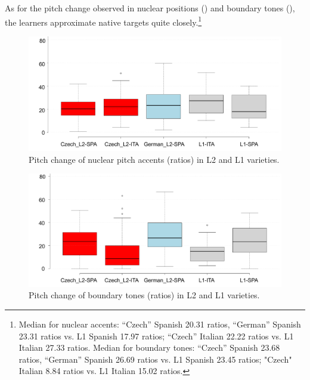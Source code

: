 As for the pitch change observed in nuclear positions () and boundary tones (), the learners approximate native targets quite closely.\footnote{Median for nuclear accents: “Czech” Spanish 20.31 ratios, “German” Spanish 23.31 ratios vs. L1 Spanish 17.97 ratios; “Czech” Italian 22.22 ratios vs. L1 Italian 27.33 ratios. Median for boundary tones: “Czech” Spanish 23.68 ratios, “German” Spanish 26.69 ratios vs. L1 Spanish 23.45 ratios; "Czech" Italian 8.84 ratios vs. L1 Italian 15.02 ratios.}


\begin{figure}
\includegraphics[width=\textwidth]{figures/Figure_52.pdf}
\caption{Pitch change of nuclear pitch accents (ratios) in L2 and L1 varieties.}
\label{fig:4.52}
\end{figure}

\begin{figure}
\includegraphics[width=\textwidth]{figures/Figure_53.pdf}
\caption{Pitch change of boundary tones (ratios) in L2 and L1 varieties.}
\label{fig:4.53}
\end{figure}

